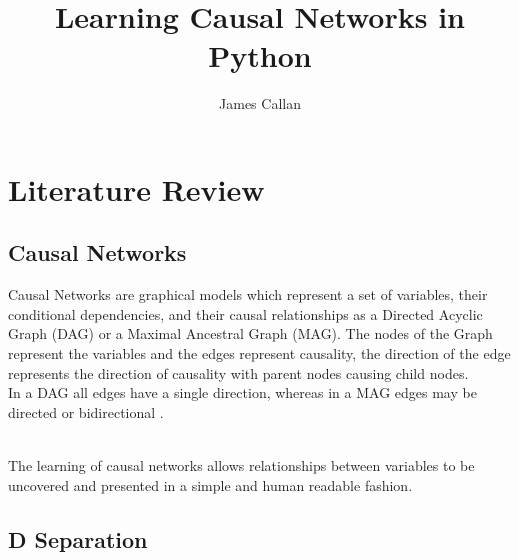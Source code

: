 \documentclass{article}
\begin{document}
\title{Learning Causal Networks in Python}
\author{James Callan}
\date{}

\maketitle

\newpage

\section{Literature Review}

\subsection{Causal Networks}

Causal Networks are graphical models which represent a set of variables, their conditional dependencies, and their causal relationships\cite{verma1990causal} as a Directed Acyclic Graph (DAG) or a Maximal Ancestral Graph (MAG). The nodes of the Graph represent the variables and the edges represent causality, the direction of the edge represents the direction of causality with parent nodes causing child nodes\cite{verma1990causal}. 
\\

In a DAG all edges have a single direction, whereas in a MAG edges may be directed or bidirectional \cite{zhang2008causal}.
\\

\\

The learning of causal networks allows relationships between variables to be uncovered and presented in a simple and human readable fashion.
\\

\subsection{D Separation}
\end{document}
